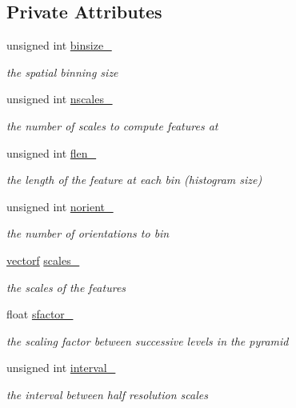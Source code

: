 \subsection*{Private Attributes}
\begin{DoxyCompactItemize}
\item 
unsigned int \hyperlink{classHOGFeatures_a9226774c97946f68829cec3d83fdbe20}{binsize\-\_\-}
\begin{DoxyCompactList}\small\item\em the spatial binning size \end{DoxyCompactList}\item 
unsigned int \hyperlink{classHOGFeatures_a503011deedc5ff736fa135149a2919f9}{nscales\-\_\-}
\begin{DoxyCompactList}\small\item\em the number of scales to compute features at \end{DoxyCompactList}\item 
unsigned int \hyperlink{classHOGFeatures_ae895d79d7725afb35846cd3e08be6b74}{flen\-\_\-}
\begin{DoxyCompactList}\small\item\em the length of the feature at each bin (histogram size) \end{DoxyCompactList}\item 
unsigned int \hyperlink{classHOGFeatures_a549b2c1d78c2fcabe8d2692f7f466687}{norient\-\_\-}
\begin{DoxyCompactList}\small\item\em the number of orientations to bin \end{DoxyCompactList}\item 
\hyperlink{types_8hpp_a4da5db3ee9e284f719ef5764dbadffc8}{vectorf} \hyperlink{classHOGFeatures_a27490a8c33c7ffbfdeedafc5af0ad544}{scales\-\_\-}
\begin{DoxyCompactList}\small\item\em the scales of the features \end{DoxyCompactList}\item 
float \hyperlink{classHOGFeatures_a45b232ca94e93b4f30d342374e62578f}{sfactor\-\_\-}
\begin{DoxyCompactList}\small\item\em the scaling factor between successive levels in the pyramid \end{DoxyCompactList}\item 
unsigned int \hyperlink{classHOGFeatures_a5e73ec994a2f8cae1b466bad5a9cb2a3}{interval\-\_\-}
\begin{DoxyCompactList}\small\item\em the interval between half resolution scales \end{DoxyCompactList}\end{DoxyCompactItemize}


